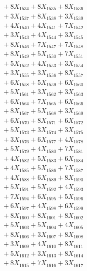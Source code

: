 \documentclass[a4paper,10pt]{article}
\begin{document}
{\begin{align}
&\;  + 8 X_{1534} + 8 X_{1535} + 8 X_{1536} \\[0.3ex]
&\;  + 3 X_{1537} + 8 X_{1538} + 3 X_{1539} \\[0.5ex]\allowbreak
&\;  + 4 X_{1540} + 4 X_{1541} + 7 X_{1542} \\[0.3ex]
&\;  + 3 X_{1543} + 4 X_{1544} + 3 X_{1545} \\[0.3ex]
&\;  + 8 X_{1546} + 7 X_{1547} + 7 X_{1548} \\[0.3ex]
&\;  + 8 X_{1549} + 5 X_{1550} + 7 X_{1551} \\[0.3ex]
&\;  + 5 X_{1552} + 4 X_{1553} + 3 X_{1554} \\[0.3ex]
&\;  + 3 X_{1555} + 3 X_{1556} + 8 X_{1557} \\[0.3ex]
&\;  + 6 X_{1558} + 5 X_{1559} + 6 X_{1560} \\[0.3ex]
&\;  + 5 X_{1561} + 3 X_{1562} + 3 X_{1563} \\[0.3ex]
&\;  + 6 X_{1564} + 7 X_{1565} + 6 X_{1566} \\[0.3ex]
&\;  + 8 X_{1567} + 5 X_{1568} + 3 X_{1569} \\[0.5ex]\allowbreak
&\;  + 6 X_{1570} + 8 X_{1571} + 6 X_{1572} \\[0.3ex]
&\;  + 5 X_{1573} + 3 X_{1574} + 3 X_{1575} \\[0.3ex]
&\;  + 3 X_{1576} + 6 X_{1577} + 4 X_{1578} \\[0.3ex]
&\;  + 5 X_{1579} + 4 X_{1580} + 7 X_{1581} \\[0.3ex]
&\;  + 4 X_{1582} + 5 X_{1583} + 6 X_{1584} \\[0.3ex]
&\;  + 4 X_{1585} + 5 X_{1586} + 7 X_{1587} \\[0.3ex]
&\;  + 4 X_{1588} + 6 X_{1589} + 8 X_{1590} \\[0.3ex]
&\;  + 5 X_{1591} + 5 X_{1592} + 4 X_{1593} \\[0.3ex]
&\;  + 7 X_{1594} + 6 X_{1595} + 5 X_{1596} \\[0.3ex]
&\;  + 6 X_{1597} + 4 X_{1598} + 6 X_{1599} \\[0.5ex]\allowbreak
&\;  + 8 X_{1600} + 8 X_{1601} + 8 X_{1602} \\[0.3ex]
&\;  + 5 X_{1603} + 5 X_{1604} + 4 X_{1605} \\[0.3ex]
&\;  + 8 X_{1606} + 3 X_{1607} + 8 X_{1608} \\[0.3ex]
&\;  + 3 X_{1609} + 4 X_{1610} + 8 X_{1611} \\[0.3ex]
&\;  + 5 X_{1612} + 3 X_{1613} + 8 X_{1614} \\[0.3ex]
&\;  + 8 X_{1615} + 7 X_{1616} + 3 X_{1617} \\[0.3ex]

\end{align}}
\end{document}

